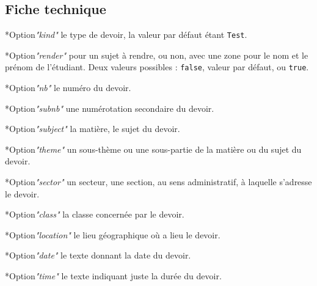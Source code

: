 \documentclass[12pt,a4paper]{scrartcl}
\makeatletter
\theoremstyle{definition}
\newcommand\IDmacro{\@ifstar{\@IDmacroStar}{\@IDmacroNoStar}}
\newcommand\@IDmacroNoStar[3]{%
        \texttt{%
        	\textbackslash#1%
        	\IfStrEq{#2}{0}{}{%
        		\,\,[#2 Option%
    			\IfStrEq{#2}{1}{}{s}]%
    		}%
    	    \IfStrEq{#3}{}{}{%
        		\,\,(#3 Argument%
    			\IfStrEq{#3}{1}{}{s})%
    		}
       	}
        \immediate\write\tempfile{macro@#1@#2@#3}%
    }
\newcommand\@IDmacroStar[2]{%
        \@IDmacroNoStar{#1}{0}{#2}%
    }
\newcommand\@IDoptarg{\@ifstar{\@IDoptargStar}{\@IDoptargNoStar}}
\newcommand\@IDoptargStar[2]{%
    	\vspace{0.5em}
    	--- \texttt{#1%
    		\IfStrEq{#2}{}{:}{\,#2:}%
    	}%
    }
\newcommand\@IDoptargNoStar[2]{%
    	\IfStrEq{#2}{}{%
    		\@IDoptargStar{#1}{}%
    	}{%
    		\@IDoptargStar{#1}{\##2}%
    	}%
    }
\newcommand\IDkey[1]{%
    	\@IDoptarg*{Option}{{\itshape "#1"}}%
    }
\makeatother
\begin{document}
%


	\subsection{Fiche technique}

\IDmacro{exam}{11}{}

\IDkey{kind} le type de devoir, la valeur par défaut étant \verb+Test+.

\IDkey{render} pour un sujet à rendre, ou non, avec une zone pour le nom et le prénom de l'étudiant. Deux valeurs possibles : \verb+false+, valeur par défaut, ou \verb+true+.

\IDkey{nb} le numéro du devoir.

\IDkey{subnb} une numérotation secondaire du devoir.

\IDkey{subject} la matière, le sujet du devoir.

\IDkey{theme} un sous-thème ou une sous-partie de la matière ou du sujet du devoir.

\IDkey{sector} un secteur, une section, au sens administratif, à laquelle s'adresse le devoir.

\IDkey{class} la classe concernée par le devoir.

\IDkey{location} le lieu géographique où a lieu le devoir.

\IDkey{date} le texte donnant la date du devoir.

\IDkey{time} le texte indiquant juste la durée du devoir.




\newcommand\exosoptions{
\IDkey{pts} le nombre de points avec le cas particulier de $0$ qui demande d'afficher "Non noté".

\IDkey{time} la durée de l'exercice.

\IDkey{id} un texte de votre choix pour remplacer le numéro (ceci a pour effet de bloquer temporairement la numérotation).

\IDkey{title} un titre.

\IDkey{note} une petite indication liée à l'exercice (comme par exemple qu'il ne s'adresse qu'aux élèves motivés).

\IDkey{src} la source utilisée pour confectionner l'exercice.
}
\end{document}
